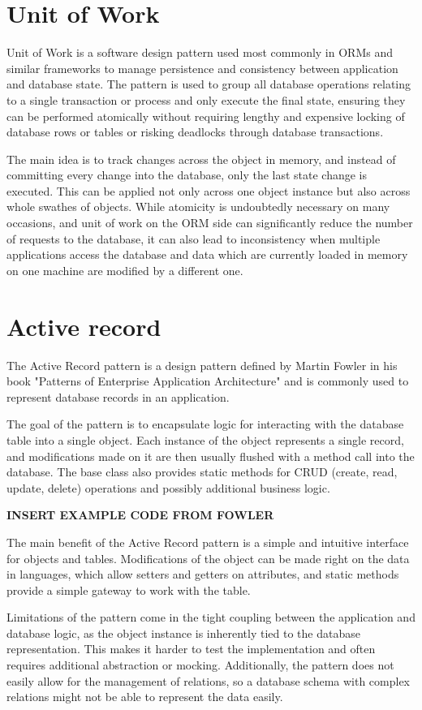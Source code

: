 \section{Unit of Work}
Unit of Work is a software design pattern used most commonly in ORMs and similar frameworks to manage persistence and consistency between application and database state. The pattern is used to group all database operations relating to a single transaction or process and only execute the final state, ensuring they can be performed atomically without requiring lengthy and expensive locking of database rows or tables or risking deadlocks through database transactions.\par
The main idea is to track changes across the object in memory, and instead of committing every change into the database, only the last state change is executed. This can be applied not only across one object instance but also across whole swathes of objects. While atomicity is undoubtedly necessary on many occasions, and unit of work on the ORM side can significantly reduce the number of requests to the database, it can also lead to inconsistency when multiple applications access the database and data which are currently loaded in memory on one machine are modified by a different one.\par

\section{Active record}
The Active Record pattern is a design pattern defined by Martin Fowler in his book "Patterns of Enterprise Application Architecture" and is commonly used to represent database records in an application.\par
The goal of the pattern is to encapsulate logic for interacting with the database table into a single object. Each instance of the object represents a single record, and modifications made on it are then usually flushed with a method call into the database. The base class also provides static methods for CRUD (create, read, update, delete) operations and possibly additional business logic.  \par

\textbf{INSERT EXAMPLE CODE FROM FOWLER}

The main benefit of the Active Record pattern is a simple and intuitive interface for objects and tables. Modifications of the object can be made right on the data in languages, which allow setters and getters on attributes, and static methods provide a simple gateway to work with the table. \par
Limitations of the pattern come in the tight coupling between the application and database logic, as the object instance is inherently tied to the database representation. This makes it harder to test the implementation and often requires additional abstraction or mocking. Additionally, the pattern does not easily allow for the management of relations, so a database schema with complex relations might not be able to represent the data easily. \par

